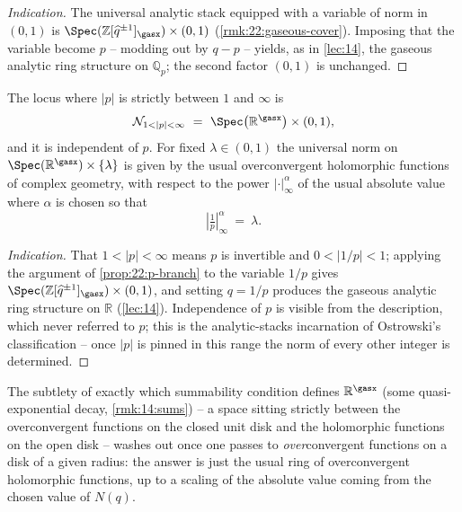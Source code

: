 \begin{proof}[Indication]
The universal analytic stack equipped with a variable of norm in $(0,1)$ is
$\Spec(\mathbb Z[\widehat q^{\pm1}]_\gasx)\times(0,1)$ (\cref{rmk:22:gaseous-cover}).
Imposing that the variable become $p$ -- modding out by $q-p$ -- yields, as in
\cref{lec:14}, the gaseous analytic ring structure on $\mathbb Q_p$; the second
factor $(0,1)$ is unchanged.
\end{proof}

\begin{proposition}
\label{prop:22:arch-branch}
The locus where $|p|$ is strictly between $1$ and $\infty$ is
\begin{equation*}
\mathcal N_{1<|p|<\infty}\ =\ \Spec\bigl(\mathbb R^{\gasx}\bigr)\times(0,1),
\end{equation*}
and it is independent of $p$. For fixed $\lambda\in(0,1)$ the universal norm on
$\Spec(\mathbb R^{\gasx})\times\{\lambda\}$ is given by the usual overconvergent
holomorphic functions of complex geometry, with respect to the power
$|\cdot|_\infty^{\alpha}$ of the usual absolute value where $\alpha$ is chosen so
that
\begin{equation*}
|\tfrac1p|_\infty^{\alpha}\ =\ \lambda .
\end{equation*}
\end{proposition}

\begin{proof}[Indication]
That $1<|p|<\infty$ means $p$ is invertible and $0<|1/p|<1$; applying the
argument of \cref{prop:22:p-branch} to the variable $1/p$ gives
$\Spec(\mathbb Z[\widehat q^{\pm1}]_\gasx)\times(0,1)$, and setting $q=1/p$
produces the gaseous analytic ring structure on $\mathbb R$ (\cref{lec:14}).
Independence of $p$ is visible from the description, which never referred to $p$;
this is the analytic-stacks incarnation of Ostrowski's classification -- once
$|p|$ is pinned in this range the norm of every other integer is determined.
\end{proof}

\begin{remark}
\label{rmk:22:overconvergence-washes-out}
The subtlety of exactly which summability condition defines $\mathbb R^{\gasx}$
(some quasi-exponential decay, \cref{rmk:14:sums}) -- a space sitting strictly
between the overconvergent functions on the closed unit disk and the holomorphic
functions on the open disk -- washes out once one passes to \emph{over}\-convergent
functions on a disk of a given radius: the answer is just the usual ring of
overconvergent holomorphic functions, up to a scaling of the absolute value
coming from the chosen value of $N(q)$.
\end{remark}

